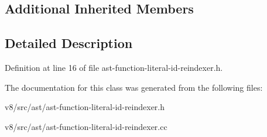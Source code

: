 \subsection*{Additional Inherited Members}


\subsection{Detailed Description}


Definition at line 16 of file ast-\/function-\/literal-\/id-\/reindexer.\+h.



The documentation for this class was generated from the following files\+:\begin{DoxyCompactItemize}
\item 
v8/src/ast/ast-\/function-\/literal-\/id-\/reindexer.\+h\item 
v8/src/ast/ast-\/function-\/literal-\/id-\/reindexer.\+cc\end{DoxyCompactItemize}
